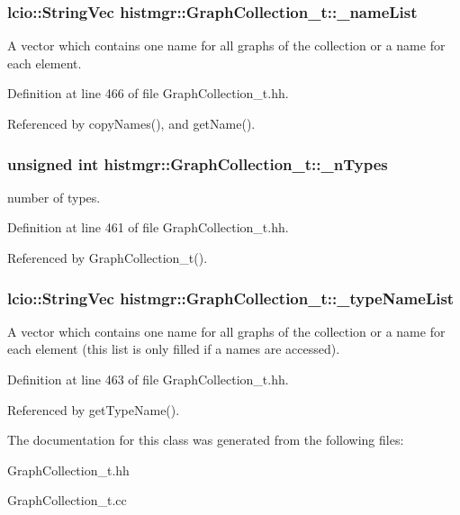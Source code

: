 \subsubsection[{\_\-nameList}]{\setlength{\rightskip}{0pt plus 5cm}lcio::StringVec {\bf histmgr::GraphCollection\_\-t::\_\-nameList}\hspace{0.3cm}{\ttfamily  [mutable, private]}}\label{classhistmgr_1_1GraphCollection__t_a49f968e20a9fa50f9d0d828c61d36028}


A vector which contains one name for all graphs of the collection or a name for each element. 

Definition at line 466 of file GraphCollection\_\-t.hh.

Referenced by copyNames(), and getName().
\subsubsection[{\_\-nTypes}]{\setlength{\rightskip}{0pt plus 5cm}unsigned int {\bf histmgr::GraphCollection\_\-t::\_\-nTypes}\hspace{0.3cm}{\ttfamily  [private]}}\label{classhistmgr_1_1GraphCollection__t_ab1a67d796536013057dc680c9f215f36}


number of types. 

Definition at line 461 of file GraphCollection\_\-t.hh.

Referenced by GraphCollection\_\-t().
\subsubsection[{\_\-typeNameList}]{\setlength{\rightskip}{0pt plus 5cm}lcio::StringVec {\bf histmgr::GraphCollection\_\-t::\_\-typeNameList}\hspace{0.3cm}{\ttfamily  [mutable, private]}}\label{classhistmgr_1_1GraphCollection__t_a17189e48d52996372e1fd52c558fbb4a}


A vector which contains one name for all graphs of the collection or a name for each element (this list is only filled if a names are accessed). 

Definition at line 463 of file GraphCollection\_\-t.hh.

Referenced by getTypeName().

The documentation for this class was generated from the following files:\begin{DoxyCompactItemize}
\item 
GraphCollection\_\-t.hh\item 
GraphCollection\_\-t.cc\end{DoxyCompactItemize}
